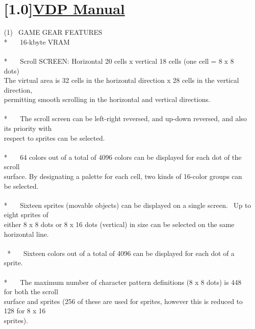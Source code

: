 \documentclass[a4paper,10pt]{article}
\begin{document}
\newpage

\section*{\scalebox{0.5}[1.0]{\uline{VDP Manual}}}

\vspace{1em}

{}

\noindent (1) \ GAME GEAR FEATURES\\
{*} \ \ \ 16-kbyte VRAM\\
\\
{*} \ \ \ Scroll SCREEN: Horizontal 20 cells x vertical 18 cells (one cell = 8 x 8 dots)\\
The virtual area is 32 cells in the horizontal direction x 28 cells in the vertical direction,\\
permitting smooth scrolling in the horizontal and vertical directions.\\
\\
{*} \ \ \ The scroll screen can be left-right reversed, and up-down reversed, and also its priority with\\
respect to sprites can be selected.\\
\\
{*} \ \ \ 64 colors out of a total of 4096 colors can be displayed for each dot of the scroll\\
surface. By designating a palette for each cell, two kinds of 16-color groups can be selected.\\
\\
{*} \ \ \ Sixteen sprites (movable objects) can be displayed on a single screen. \ Up to eight sprites of\\
either 8 x 8 dots or 8 x 16 dots (vertical) in size can be selected on the same horizontal line.\\
\\
\phantom \ {*} \ \ \ Sixteen colors out of a total of 4096 can be displayed for each dot of a sprite.\\
\\
{*} \ \ \ The maximum number of character pattern definitions (8 x 8 dots) is 448 for both the scroll\\
surface and sprites (256 of these are used for sprites, however this is reduced to 128 for 8 x 16\\
sprites).
\end{document}
